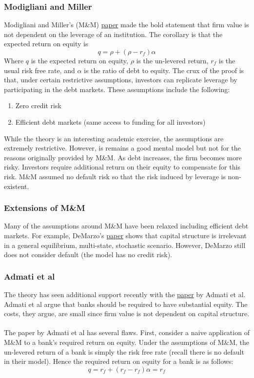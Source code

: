 \documentclass{article}
\theoremstyle{definition}
\begin{document}
\subsubsection{Modigliani and Miller}
Modigliani and Miller's (M\&M) \href{https://gvpesquisa.fgv.br/sites/gvpesquisa.fgv.br/files/arquivos/terra_-_the_cost_of_capital_corporation_finance.pdf}{paper} made the bold statement that firm value is not dependent on the leverage of an institution.  The corollary is that the expected return on equity is
\[q=\rho+(\rho-r_f)\alpha\]
Where \(q\) is the expected return on equity, \(\rho\) is the un-levered return, \(r_f\) is the usual risk free rate, and \(\alpha\) is the ratio of debt to equity.  The crux of the proof is that, under certain restrictive assumptions, investors can replicate leverage by participating in the debt markets.  These assumptions include the following:
\begin{enumerate}
	\item Zero credit risk
	\item Efficient debt markets (same access to funding for all investors)
\end{enumerate}

While the theory is an interesting academic exercise, the assumptions are extremely restrictive. However, is remains a good mental model but not for the reasons originally provided by M\&M.  As debt increases, the firm becomes more risky.  Investors require additional return on their equity to compensate for this risk.  M\&M assumed no default risk so that the risk induced by leverage is non-existent.  

\subsubsection{Extensions of M\&M}
Many of the assumptions around M\&M have been relaxed including efficient debt markets.  For example, DeMarzo's \href{https://www.gsb.stanford.edu/sites/gsb/files/publication-pdf/MM%20with%20Incomplete%20Markets%20JET%2088.pdf}{paper} shows that capital structure is irrelevant in a general equilibrium, multi-state, stochastic scenario.  However, DeMarzo still does not consider default (the model has no credit risk).

\subsubsection{Admati et al}

The theory has seen additional support recently with the \href{https://www.coll.mpg.de/pdf_dat/2010_42online.pdf}{paper} by Admati et al.  Admati et al argue that banks should be required to have substantial equity.  The costs, they argue, are small since firm value is not dependent on capital structure.  
\\
\\
The paper by Admati et al has several flaws.  First, consider a naive application of M\&M to a bank's required return on equity.  Under the assumptions of M\&M, the un-levered return of a bank is simply the risk free rate (recall there is no default in their model).  Hence the required return on equity for a bank is as follows:
\[q=r_f+(r_f-r_f)\alpha=r_f\]
\end{document}
